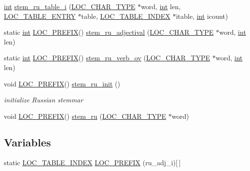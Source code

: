 \begin{DoxyCompactItemize}
\item 
\hyperlink{sphinxexpr_8cpp_a4a26e8f9cb8b736e0c4cbf4d16de985e}{int} \hyperlink{sphinxstemru_8inl_a041878a0901c8b1459c45a82da45fe30}{stem\-\_\-ru\-\_\-table\-\_\-i} (\hyperlink{sphinxstemru_8cpp_abfbd757779fad3c24ae46017861aec77}{L\-O\-C\-\_\-\-C\-H\-A\-R\-\_\-\-T\-Y\-P\-E} $\ast$word, \hyperlink{sphinxexpr_8cpp_a4a26e8f9cb8b736e0c4cbf4d16de985e}{int} len, \hyperlink{structLOC__TABLE__ENTRY}{L\-O\-C\-\_\-\-T\-A\-B\-L\-E\-\_\-\-E\-N\-T\-R\-Y} $\ast$table, \hyperlink{structLOC__TABLE__INDEX}{L\-O\-C\-\_\-\-T\-A\-B\-L\-E\-\_\-\-I\-N\-D\-E\-X} $\ast$itable, \hyperlink{sphinxexpr_8cpp_a4a26e8f9cb8b736e0c4cbf4d16de985e}{int} icount)
\item 
static \hyperlink{sphinxexpr_8cpp_a4a26e8f9cb8b736e0c4cbf4d16de985e}{int} \hyperlink{sphinxstemru_8inl_a239cc7b2d29b4af3b38b5c1871a09587}{L\-O\-C\-\_\-\-P\-R\-E\-F\-I\-X}() \hyperlink{sphinxstemru_8inl_a5ad68670bc726ba8175491f8c1a23782}{stem\-\_\-ru\-\_\-adjectival} (\hyperlink{sphinxstemru_8cpp_abfbd757779fad3c24ae46017861aec77}{L\-O\-C\-\_\-\-C\-H\-A\-R\-\_\-\-T\-Y\-P\-E} $\ast$word, \hyperlink{sphinxexpr_8cpp_a4a26e8f9cb8b736e0c4cbf4d16de985e}{int} len)
\item 
static \hyperlink{sphinxexpr_8cpp_a4a26e8f9cb8b736e0c4cbf4d16de985e}{int} \hyperlink{sphinxstemru_8inl_a239cc7b2d29b4af3b38b5c1871a09587}{L\-O\-C\-\_\-\-P\-R\-E\-F\-I\-X}() \hyperlink{sphinxstemru_8inl_aac53c767e3a8118b89aa18c3b234ded9}{stem\-\_\-ru\-\_\-verb\-\_\-ov} (\hyperlink{sphinxstemru_8cpp_abfbd757779fad3c24ae46017861aec77}{L\-O\-C\-\_\-\-C\-H\-A\-R\-\_\-\-T\-Y\-P\-E} $\ast$word, \hyperlink{sphinxexpr_8cpp_a4a26e8f9cb8b736e0c4cbf4d16de985e}{int} len)
\item 
void \hyperlink{sphinxstemru_8inl_a239cc7b2d29b4af3b38b5c1871a09587}{L\-O\-C\-\_\-\-P\-R\-E\-F\-I\-X}() \hyperlink{sphinxstemru_8inl_ae88e93e6d4b75bb79b79cd5546a66861}{stem\-\_\-ru\-\_\-init} ()
\begin{DoxyCompactList}\small\item\em initialize Russian stemmar \end{DoxyCompactList}\item 
void \hyperlink{sphinxstemru_8inl_a239cc7b2d29b4af3b38b5c1871a09587}{L\-O\-C\-\_\-\-P\-R\-E\-F\-I\-X}() \hyperlink{sphinxstemru_8inl_a8ccd2b75cd24c79d83c680811ad42277}{stem\-\_\-ru} (\hyperlink{sphinxstemru_8cpp_abfbd757779fad3c24ae46017861aec77}{L\-O\-C\-\_\-\-C\-H\-A\-R\-\_\-\-T\-Y\-P\-E} $\ast$word)
\end{DoxyCompactItemize}
\subsection*{Variables}
\begin{DoxyCompactItemize}
\item 
static \hyperlink{structLOC__TABLE__INDEX}{L\-O\-C\-\_\-\-T\-A\-B\-L\-E\-\_\-\-I\-N\-D\-E\-X} \hyperlink{sphinxstemru_8inl_abcaf6d3a288b987898e1a11d1b4ef1b9}{L\-O\-C\-\_\-\-P\-R\-E\-F\-I\-X} (ru\-\_\-adj\-\_\-i)\mbox{[}$\,$\mbox{]}
\end{DoxyCompactItemize}


